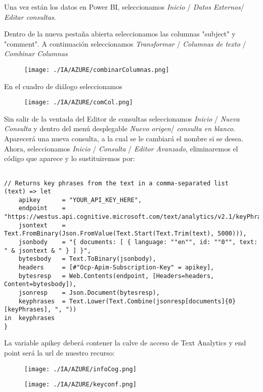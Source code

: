 \documentclass[runningheads]{llncs}
\begin{document}
Una vez están los datos en Power BI, seleccionamos \textit{Inicio} / \textit{Datos Externos}/ \textit{Editar consultas}.

Dentro de la nueva pestaña abierta seleccionamos las columnas "subject" y "comment". A continuación seleccionamos \textit{Transformar} / \textit{Columnas de texto} / \textit{Combinar Columnas}

\begin{figure}[H]
\texttt{[image: ./IA/AZURE/combinarColumnas.png]}
\end{figure}

En el cuadro de diálogo seleccionamos 

\begin{figure}[H]
\texttt{[image: ./IA/AZURE/comCol.png]}
\end{figure}

Sin salir de la ventada del Editor de consultas seleccionamos \textit{Inicio} / \textit{Nueva Consulta} y dentro del menú desplegable \textit{Nuevo origen}/ \textit{consulta en blanco}. Aparecerá una nueva consulta, a la cual se le cambiará el nombre si se desea.
Ahora, seleccionamos \textit{Inicio} / \textit{Consulta} / \textit{Editor Avanzado}, eliminaremos el código que aparece y lo sustituiremos por:
\small{
\begin{verbatim}

// Returns key phrases from the text in a comma-separated list
(text) => let
    apikey      = "YOUR_API_KEY_HERE",
    endpoint    = "https://westus.api.cognitive.microsoft.com/text/analytics/v2.1/keyPhrases",
    jsontext    = Text.FromBinary(Json.FromValue(Text.Start(Text.Trim(text), 5000))),
    jsonbody    = "{ documents: [ { language: ""en"", id: ""0"", text: " & jsontext & " } ] }",
    bytesbody   = Text.ToBinary(jsonbody),
    headers     = [#"Ocp-Apim-Subscription-Key" = apikey],
    bytesresp   = Web.Contents(endpoint, [Headers=headers, Content=bytesbody]),
    jsonresp    = Json.Document(bytesresp),
    keyphrases  = Text.Lower(Text.Combine(jsonresp[documents]{0}[keyPhrases], ", "))
in  keyphrases
}
\end{verbatim}
}
La variable apikey deberá contener la calve de acceso de Text Analytics y end point será la url de nuestro recurso: 
\begin{figure}[H]
\centering
\texttt{[image: ./IA/AZURE/infoCog.png]}
\end{figure}
\begin{figure}[H]
\centering
\texttt{[image: ./IA/AZURE/keyconf.png]}
\end{figure}
\end{document}
